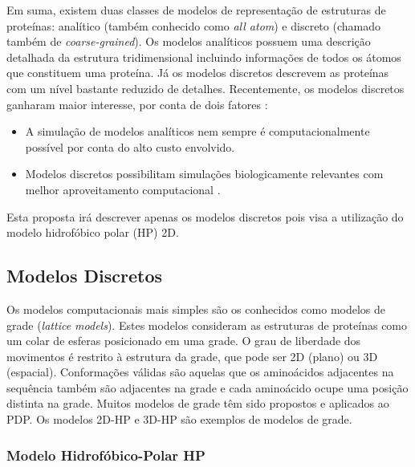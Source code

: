 Em suma, existem duas classes de modelos de representação de estruturas de proteínas: analítico (também conhecido como \textit{all atom}) e discreto (chamado também de \textit{coarse-grained}). Os modelos analíticos possuem uma descrição detalhada da estrutura tridimensional incluindo informações de todos os átomos que constituem uma proteína. Já os modelos discretos descrevem as proteínas com um nível bastante reduzido de detalhes. Recentemente, os modelos discretos ganharam maior interesse, por conta de dois fatores \cite{benitez2015algoritmo}:

\begin{itemize}
	\item A simulação de modelos analíticos nem sempre é computacionalmente possível por conta do alto custo envolvido.
	\item Modelos discretos possibilitam simulações biologicamente relevantes com melhor aproveitamento  computacional . 
	
\end{itemize}

 Esta proposta irá descrever apenas os modelos discretos pois visa a utilização do modelo hidrofóbico polar (HP) 2D.

\subsection{Modelos Discretos}

Os modelos computacionais mais simples são os conhecidos como modelos de grade (\textit{lattice models}). Estes modelos consideram as estruturas de proteínas como um colar de esferas posicionado em uma grade. O grau de liberdade dos movimentos é restrito à estrutura da grade, que pode ser 2D (plano) ou 3D (espacial). Conformações válidas são aquelas que os aminoácidos adjacentes na sequência também são adjacentes na grade e cada aminoácido ocupe uma posição distinta na grade. Muitos modelos de grade têm sido propostos e aplicados ao PDP. Os modelos 2D-HP e 3D-HP são exemplos de modelos de grade.

\subsubsection{Modelo Hidrofóbico-Polar HP}
\label{subsubsection:modeloHP}

